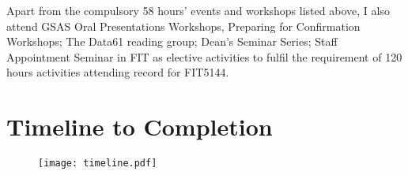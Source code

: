 Apart from the compulsory 58 hours' events and workshops listed above, I also attend GSAS Oral Presentations Workshops, Preparing for Confirmation Workshops; The Data61 reading group; Dean's Seminar Series; Staff Appointment Seminar in FIT as elective activities to fulfil the requirement of 120 hours activities attending record for FIT5144.


\chapter{Timeline to Completion}
\begin{figure}[h]
\texttt{[image: timeline.pdf]}
\end{figure}
